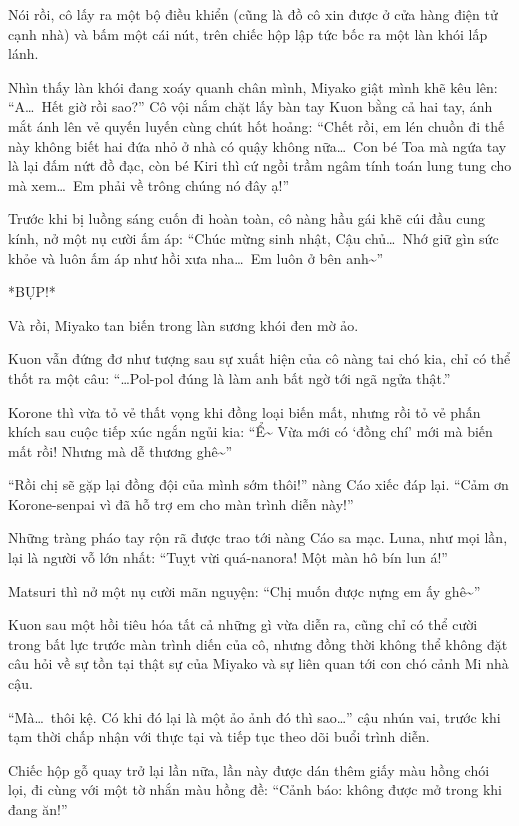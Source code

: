 \documentclass[../main.tex]{subfiles}
\begin{document}
Nói rồi, cô lấy ra một bộ điều khiển (cũng là đồ cô xin được ở cửa hàng điện tử cạnh nhà) và bấm một cái nút, trên chiếc hộp lập tức bốc ra một làn khói lấp lánh.

Nhìn thấy làn khói đang xoáy quanh chân mình, Miyako giật mình khẽ kêu lên: ``A\dots\ Hết giờ rồi sao?'' Cô vội nắm chặt lấy bàn tay Kuon bằng cả hai tay, ánh mắt ánh lên vẻ quyến luyến cùng chút hốt hoảng: ``Chết rồi, em lén chuồn đi thế này không biết hai đứa nhỏ ở nhà có quậy không nữa\dots\ Con bé Toa mà ngứa tay là lại đấm nứt đồ đạc, còn bé Kiri thì cứ ngồi trầm ngâm tính toán lung tung cho mà xem\dots\ Em phải về trông chúng nó đây ạ!''

Trước khi bị luồng sáng cuốn đi hoàn toàn, cô nàng hầu gái khẽ cúi đầu cung kính, nở một nụ cười ấm áp: ``Chúc mừng sinh nhật, Cậu chủ\dots\ Nhớ giữ gìn sức khỏe và luôn ấm áp như hồi xưa nha\dots\ Em luôn ở bên anh\~{}''

*BỤP!*

Và rồi, Miyako tan biến trong làn sương khói đen mờ ảo.

Kuon vẫn đứng đơ như tượng sau sự xuất hiện của cô nàng tai chó kia, chỉ có thể thốt ra một câu: ``\dots Pol-pol đúng là làm anh bất ngờ tới ngã ngửa thật.''

Korone thì vừa tỏ vẻ thất vọng khi đồng loại biến mất, nhưng rồi tỏ vẻ phấn khích sau cuộc tiếp xúc ngắn ngủi kia: ``Ể\~{} Vừa mới có `đồng chí' mới mà biến mất rồi! Nhưng mà dễ thương ghê\~{}''

``Rồi chị sẽ gặp lại đồng đội của mình sớm thôi!'' nàng Cáo xiếc đáp lại. ``Cảm ơn Korone-senpai vì đã hỗ trợ em cho màn trình diễn này!''

Những tràng pháo tay rộn rã được trao tới nàng Cáo sa mạc. Luna, như mọi lần, lại là người vỗ lớn nhất: ``Tuỵt vừi quá-nanora! Một màn hô bín lun á!''

Matsuri thì nở một nụ cười mãn nguyện: ``Chị muốn được nựng em ấy ghê\~{}''

Kuon sau một hồi tiêu hóa tất cả những gì vừa diễn ra, cũng chỉ có thể cười trong bất lực trước màn trình diến của cô, nhưng đồng thời không thể không đặt câu hỏi về sự tồn tại thật sự của Miyako và sự liên quan tới con chó cảnh Mi nhà cậu.

``Mà\dots\ thôi kệ. Có khi đó lại là một ảo ảnh đó thì sao\dots'' cậu nhún vai, trước khi tạm thời chấp nhận với thực tại và tiếp tục theo dõi buổi trình diễn.

\ct

Chiếc hộp gỗ quay trở lại lần nữa, lần này được dán thêm giấy màu hồng chói lọi, đi cùng với một tờ nhắn màu hồng đề: ``Cảnh báo: không được mở trong khi đang ăn!''
\end{document}
